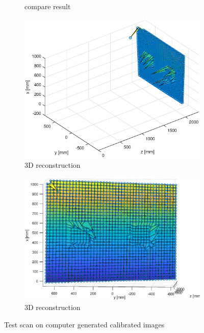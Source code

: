 \begin{figure}[h!]
\begin{subfigure}[t]{0.35\linewidth}
		\caption{compare result}
		\label{fig:test3}
	\end{subfigure}
	\begin{subfigure}[t]{0.45\linewidth}
		\centering
		\includegraphics[width=1\linewidth]{figures/part2/test2_scan}
		\caption{3D reconstruction}
		\label{fig:test4}
	\end{subfigure}
	\begin{subfigure}[t]{0.45\linewidth}
		\centering
		\includegraphics[width=1\linewidth]{figures/part2/test2_scan1}
		\caption{3D reconstruction}
		\label{fig:test5}
	\end{subfigure}
	\caption{Test scan on computer generated calibrated images}
	\label{fig:test_scan}
 
\end{figure}


